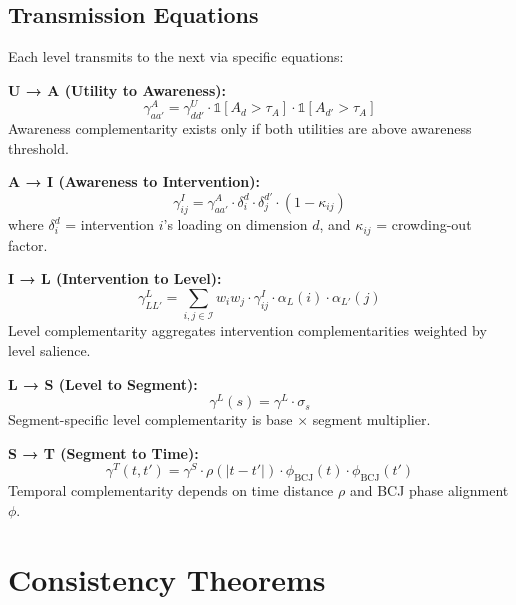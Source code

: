 \subsection{Transmission Equations}

Each level transmits to the next via specific equations:

\begin{tcolorbox}[colback=gray!5!white, colframe=gray!75!black,
    title=Theorem UNMAPPED_GTC-2: Transmission Equations]

\textbf{U → A (Utility to Awareness):}
\begin{equation}
\gamma^A_{aa'} = \gamma^U_{dd'} \cdot \mathbb{1}[A_d > \tau_A] \cdot \mathbb{1}[A_{d'} > \tau_A]
\end{equation}
Awareness complementarity exists only if both utilities are above awareness threshold.

\textbf{A → I (Awareness to Intervention):}
\begin{equation}
\gamma^I_{ij} = \gamma^A_{aa'} \cdot \delta_i^d \cdot \delta_j^{d'} \cdot (1 - \kappa_{ij})
\end{equation}
where $\delta_i^d$ = intervention $i$'s loading on dimension $d$, and
$\kappa_{ij}$ = crowding-out factor.

\textbf{I → L (Intervention to Level):}
\begin{equation}
\gamma^L_{LL'} = \sum_{i,j \in \mathcal{I}} w_i w_j \cdot \gamma^I_{ij} \cdot \alpha_L(i) \cdot \alpha_{L'}(j)
\end{equation}
Level complementarity aggregates intervention complementarities weighted by
level salience.

\textbf{L → S (Level to Segment):}
\begin{equation}
\gamma^L(s) = \gamma^L \cdot \sigma_s
\end{equation}
Segment-specific level complementarity is base $\times$ segment multiplier.

\textbf{S → T (Segment to Time):}
\begin{equation}
\gamma^T(t, t') = \gamma^S \cdot \rho(|t - t'|) \cdot \phi_{\text{BCJ}}(t) \cdot \phi_{\text{BCJ}}(t')
\end{equation}
Temporal complementarity depends on time distance $\rho$ and BCJ phase alignment $\phi$.

\end{tcolorbox}

\section{Consistency Theorems}
\label{sec:gtc-consistency}

